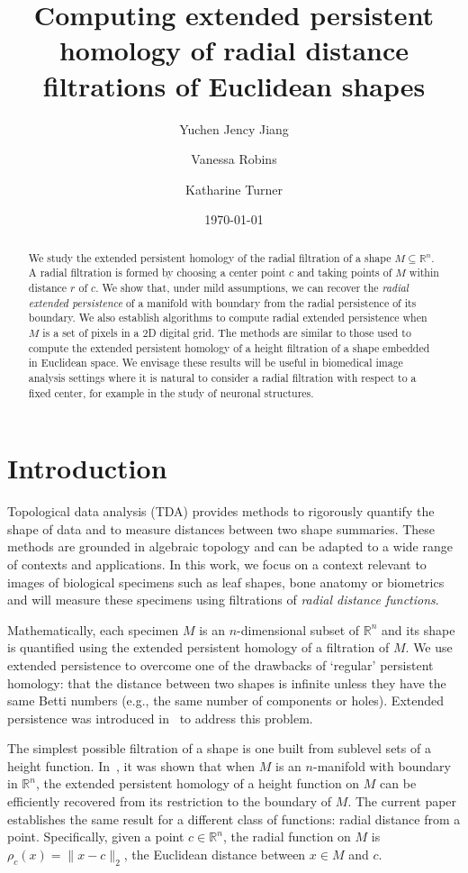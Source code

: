 \documentclass[a4paper,11pt]{article}
\title{Computing extended persistent homology of radial distance filtrations of {E}uclidean shapes}
\author[1]{Yuchen Jency Jiang}
\author[2]{Vanessa Robins}
\author[3]{Katharine Turner}
\affil[1]{Division of Applied Mathematics, Brown University}
\affil[2]{Research School of Physics, Australian National University}
\affil[3]{Mathematical Sciences Institute, Australian National University}
\date{\today}
\theoremstyle{definition}
\newcommand{\R}{\mathbb{R}}
\begin{document}
\maketitle

\begin{abstract}
   We study the extended persistent homology of the radial filtration of a shape $M\subseteq \mathbb{R}^n$. A radial filtration is formed by choosing a center point $c$ and taking points of $M$ within distance $r$ of $c$. We show that, under mild assumptions, we can recover the \emph{radial extended persistence} of a manifold with boundary from the radial persistence of its boundary. We also establish algorithms to compute radial extended persistence when $M$ is a set of pixels in a 2D digital grid. The methods are similar to those used to compute the extended persistent homology of a height filtration of a shape embedded in Euclidean space. We envisage these results will be useful in biomedical image analysis settings where it is natural to consider a radial filtration with respect to a fixed center, for example in the study of neuronal structures.
\end{abstract}


\section{Introduction}


Topological data analysis (TDA) provides methods to rigorously quantify the shape of data and to measure distances between two shape summaries. 
These methods are grounded in algebraic topology and can be adapted to a wide range of contexts and applications. 
In this work, we focus on a context relevant to images of biological specimens such as leaf shapes, bone anatomy or biometrics and will measure these specimens using filtrations of \emph{radial distance functions}. 

Mathematically, each specimen $M$ is an $n$-dimensional subset of $\R^n$ and its shape is quantified using the extended persistent homology of a filtration of $M$. 
We use extended persistence to overcome one of the drawbacks of `regular' persistent homology: that the distance between two shapes is infinite unless they have the same Betti numbers (e.g., the same number of components or holes). Extended persistence was introduced in~\cite{dualityMore} to address this problem. 

The simplest possible filtration of a shape is one built from sublevel sets of a height function. 
In~\cite{KT2022}, it was shown that when $M$ is an $n$-manifold with boundary in $\R^n$, the extended persistent homology of a height function on $M$ can be efficiently recovered from its restriction to the boundary of $M$.
The current paper establishes the same result for a different class of functions: radial distance from a point. 
Specifically, given a point $c \in \R^n$, the radial function on $M$ is $\rho_c(x) = \|x-c\|_2$, the Euclidean distance between $x \in M$  and $c$. 
\end{document}
